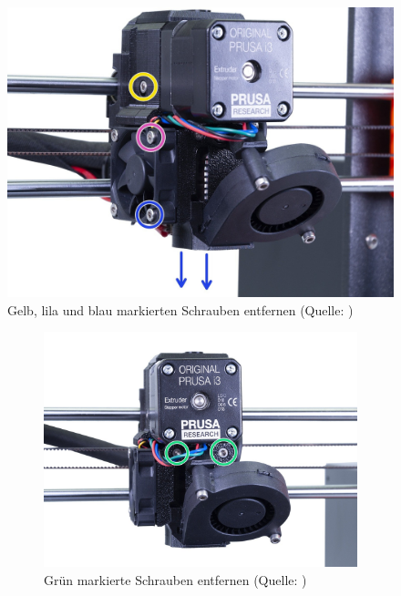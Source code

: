 \begin{itemize}
      \begin{figure}[h] 
        \centering
        \includegraphics[width=0.5\linewidth]{bilder/Anleitung - Schraubi1.jpg}
              \caption[Anleitung: Gelb, lila und blau markierten Schrauben entfernen] {Gelb, lila und blau markierten Schrauben entfernen (Quelle: \autocite{Prusa})}
        \label{Schraubi1}
      \end{figure}
      \begin{figure}[h]
        \centering
        \begin{subfigure}[b]{0.45\textwidth}
          \includegraphics[width=\textwidth]{bilder/Anleitung - Schraubi2.jpg}
          \caption[Anleitung: Grün markierte Schrauben entfernen] {Grün markierte Schrauben entfernen (Quelle: \autocite{Prusa})}
          \label{Schraubi2}
        \end{subfigure}
        \hfill
        \begin{subfigure}[b]{0.45\textwidth}

\end{subfigure}
\end{figure}
\end{itemize}
